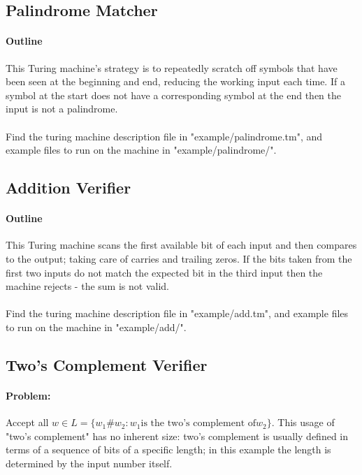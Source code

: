 \documentclass[]{article}
\begin{document}
\subsection{Palindrome Matcher}\label{sec:machine:palindrome}
\paragraph{Outline} This Turing machine's strategy is to repeatedly scratch off symbols that have been seen at the beginning and end, reducing the working input each time. If a symbol at the start does not have a corresponding symbol at the end then the input is not a palindrome.
\\\\
\noindent Find the turing machine description file in "example/palindrome.tm", and example files to run on the machine in "example/palindrome/".

\subsection{Addition Verifier}\label{sec:machine:adder}
\paragraph{Outline} This Turing machine scans the first available bit of each input and then compares to the output; taking care of carries and trailing zeros. If the bits taken from the first two inputs do not match the expected bit in the third input then the machine rejects - the sum is not valid.
\\\\
\noindent Find the turing machine description file in "example/add.tm", and example files to run on the machine in "example/add/".

\subsection{Two's Complement Verifier}\label{sec:machine:twoscomplement}
\paragraph{Problem:} Accept all $w \in L = \{ w_1\#w_2 : w_1\text{is the two's complement of}w_2 \}$. This usage of "two's complement" has no inherent size: two's complement is usually defined in terms of a sequence of bits of a specific length; in this example the length is determined by the input number itself.
\end{document}

